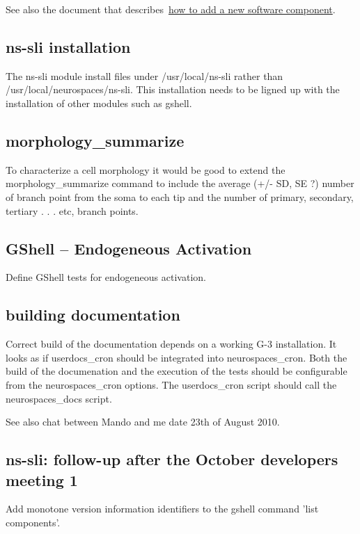 \documentclass[12pt]{article}
\begin{document}
See also the document that
describes~\href{../genesis-addto-component-developerpackage/genesis-addto-component-developerpackage.tex}{how
  to add a new software component}.


\subsection{ns-sli installation}

The ns-sli module install files under /usr/local/ns-sli rather than
/usr/local/neurospaces/ns-sli.  This installation needs to be ligned
up with the installation of other modules such as gshell.


\subsection{morphology\_summarize}

To characterize a cell morphology it would be good to extend the
morphology\_summarize command to include the average (+/- SD, SE ?)
number of branch point from the soma to each tip and the number of
primary, secondary, tertiary . . . etc, branch points.


\subsection{GShell -- Endogeneous Activation}

Define GShell tests for endogeneous activation.


\subsection{building documentation}

Correct build of the documentation depends on a working G-3
installation.  It looks as if userdocs\_cron should be integrated into
neurospaces\_cron.  Both the build of the documenation and the
execution of the tests should be configurable from the
neurospaces\_cron options.  The userdocs\_cron script should call the
neurospaces\_docs script.

See also chat between Mando and me date 23th of August 2010.


\subsection{ns-sli: follow-up after the October developers meeting 1}

Add monotone version information identifiers to the gshell command
'list components'.
\end{document}
